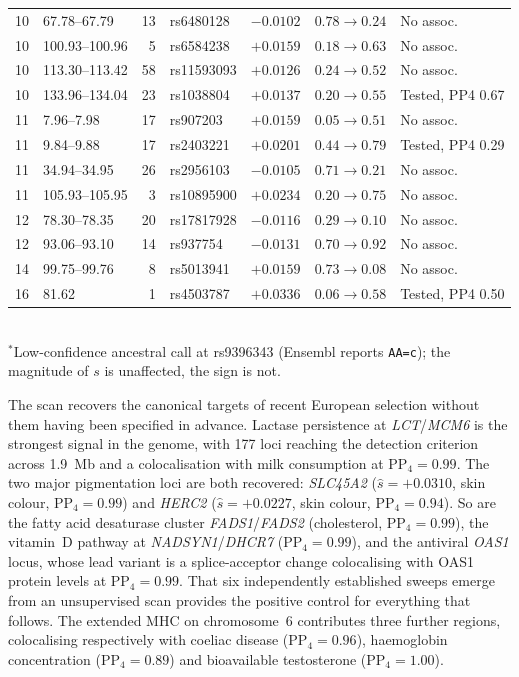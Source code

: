 \documentclass{article}
\begin{document}
\begin{table}[t]
\begin{tabular}{@{}clrlcl>{\raggedright\arraybackslash}p{2.3cm}@{}}
    10 & 67.78--67.79   & 13 & rs6480128   & $-0.0102$ & $0.78\!\to\!0.24$ & No assoc. \\
    10 & 100.93--100.96 & 5  & rs6584238   & $+0.0159$ & $0.18\!\to\!0.63$ & No assoc. \\
    10 & 113.30--113.42 & 58 & rs11593093  & $+0.0126$ & $0.24\!\to\!0.52$ & No assoc. \\
    10 & 133.96--134.04 & 23 & rs1038804   & $+0.0137$ & $0.20\!\to\!0.55$ & Tested, PP4 0.67 \\
    11 & 7.96--7.98     & 17 & rs907203    & $+0.0159$ & $0.05\!\to\!0.51$ & No assoc. \\
    11 & 9.84--9.88     & 17 & rs2403221   & $+0.0201$ & $0.44\!\to\!0.79$ & Tested, PP4 0.29 \\
    11 & 34.94--34.95   & 26 & rs2956103   & $-0.0105$ & $0.71\!\to\!0.21$ & No assoc. \\
    11 & 105.93--105.95 & 3  & rs10895900  & $+0.0234$ & $0.20\!\to\!0.75$ & No assoc. \\
    12 & 78.30--78.35   & 20 & rs17817928  & $-0.0116$ & $0.29\!\to\!0.10$ & No assoc. \\
    12 & 93.06--93.10   & 14 & rs937754    & $-0.0131$ & $0.70\!\to\!0.92$ & No assoc. \\
    14 & 99.75--99.76   & 8  & rs5013941   & $+0.0159$ & $0.73\!\to\!0.08$ & No assoc. \\
    16 & 81.62          & 1  & rs4503787   & $+0.0336$ & $0.06\!\to\!0.58$ & Tested, PP4 0.50 \\
    \bottomrule
    \end{tabular}
    \\[2pt]
    \footnotesize $^{*}$Low-confidence ancestral call at rs9396343 (Ensembl reports \texttt{AA=c}); the magnitude of $s$ is unaffected, the sign is not.
\end{table}

The scan recovers the canonical targets of recent European selection without them having been specified in advance.
Lactase persistence at \textit{LCT}/\textit{MCM6} is the strongest signal in the genome, with 177 loci reaching the detection criterion across 1.9~Mb and a colocalisation with milk consumption at PP$_4 = 0.99$.
The two major pigmentation loci are both recovered: \textit{SLC45A2} ($\hat{s} = +0.0310$, skin colour, PP$_4 = 0.99$) and
\textit{HERC2} ($\hat{s} = +0.0227$, skin colour, PP$_4 = 0.94$).
So are the fatty acid desaturase cluster \textit{FADS1}/\textit{FADS2} (cholesterol,
PP$_4 = 0.99$), the vitamin~D pathway at \textit{NADSYN1}/\textit{DHCR7} (PP$_4 = 0.99$), and the antiviral \textit{OAS1} locus, whose lead variant is a splice-acceptor change colocalising with OAS1 protein levels at PP$_4 = 0.99$.
That six independently established sweeps emerge from an unsupervised scan provides the positive control for everything that follows.
The extended MHC on chromosome~6 contributes three further regions,
colocalising respectively with coeliac disease (PP$_4 = 0.96$), haemoglobin
concentration (PP$_4 = 0.89$) and bioavailable testosterone (PP$_4 = 1.00$).
\end{document}

